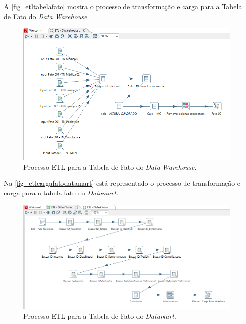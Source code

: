 A \autoref{fig_etltabelafato} mostra o processo de transformação e carga para a Tabela de Fato do \textit{Data Warehouse}. 
\begin{figure}[htb]
	\caption{\label{fig_etltabelafato}Processo ETL para a Tabela de Fato do \textit{Data Warehouse}.}
	\begin{center}
	    \includegraphics[scale=0.75]{Imagens/figura - etl dw fato.png}
	\end{center}
\end{figure}

\newpage
Na \autoref{fig_etlcargafatodatamart} está representado o processo de transformação e carga para a tabela fato do \textit{Datamart}. 
\begin{figure}[htb]
	\caption{\label{fig_etlcargafatodatamart}Processo ETL para a Tabela de Fato do \textit{Datamart}.}
	\begin{center}
	    \includegraphics[scale=0.57]{Imagens/figura - etl dm fato.png}
	\end{center}
\end{figure}

